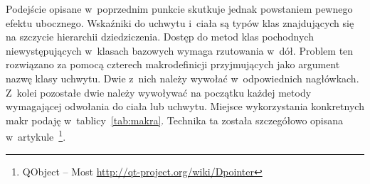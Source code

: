 Podejście opisane w~poprzednim punkcie skutkuje jednak powstaniem pewnego efektu ubocznego.
Wskaźniki do uchwytu i~ciała są typów klas znajdujących się na szczycie hierarchii dziedziczenia. Dostęp do metod klas pochodnych niewystępujących w~klasach bazowych wymaga rzutowania w~dół. 
Problem ten rozwiązano za pomocą czterech makrodefinicji przyjmujących jako argument nazwę klasy uchwytu. Dwie z~nich należy wywołać w~odpowiednich nagłówkach. Z~kolei pozostałe dwie należy wywoływać na początku każdej metody wymagającej odwołania do ciała lub uchwytu. Miejsce wykorzystania konkretnych makr podaję w~tablicy~\ref{tab:makra}. Technika ta została szczegółowo opisana w~artykule~\footnote{QObject -- Most \url{http://qt-project.org/wiki/Dpointer}}.


